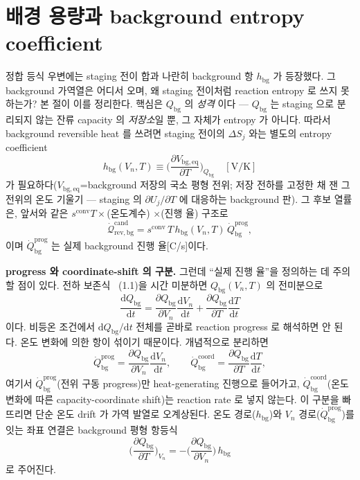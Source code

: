 \documentclass[11pt,a4paper]{article}
\newcommand{\dd}{\mathrm{d}}
\newcommand{\eq}{\mathrm{eq}}
\newcommand{\bg}{\mathrm{bg}}
\newcommand{\rev}{\mathrm{rev}}
\newcommand{\conv}{\mathrm{conv}}
\newcommand{\prog}{\mathrm{prog}}
\newcommand{\coord}{\mathrm{coord}}
\newcommand{\cand}{\mathrm{cand}}
\begin{document}
\section{배경 용량과 background entropy coefficient}\label{sec:ch2_bg}
정합 등식 우변에는 staging 전이 합과 나란히 background 항 $h_\bg$ 가 등장했다. 그 background 가역열은 어디서
오며, 왜 staging 전이처럼 reaction entropy 로 쓰지 못하는가? 본 절이 이를 정리한다. 핵심은 $Q_\bg$ 의 \emph{성격}
이다 — $Q_\bg$ 는 staging 으로 분리되지 않는 잔류 capacity 의 \emph{저장소}일 뿐, 그 자체가 entropy 가 아니다.
따라서 background reversible heat 를 쓰려면 staging 전이의 $\Delta S_j$ 와는 별도의 entropy coefficient
\begin{equation}
h_\bg(V_n,T)\equiv\Big(\frac{\partial V_{\bg,\eq}}{\partial T}\Big)_{Q_\bg}\quad[\mathrm{V/K}]
\label{eq:ch2_hbg}
\end{equation}
가 필요하다($V_{\bg,\eq}$=background 저장의 국소 평형 전위; 저장 전하를 고정한 채 잰 그 전위의 온도 기울기 —
staging 의 $\partial U_j/\partial T$ 에 대응하는 background 판). 그 후보 열률은, 앞서와 같은 $s^{\conv}T\times$(온도계수)
$\times$(진행 율) 구조로
\begin{equation}
\dot{\mathcal Q}_{\rev,\bg}^{\cand}=s^{\conv}\,T\,h_\bg(V_n,T)\,\dot Q_\bg^{\prog},
\label{eq:ch2_revbg}
\end{equation}
이며 $\dot Q_\bg^{\prog}$ 는 실제 background 진행 율[C/s]이다.

\textbf{progress 와 coordinate-shift 의 구분.} 그런데 ``실제 진행 율''을 정의하는 데 주의할 점이 있다. 전하 보존식
~(1.1)을 시간 미분하면 $Q_\bg(V_n,T)$ 의 전미분으로
\begin{equation}
\frac{\dd Q_\bg}{\dd t}=\frac{\partial Q_\bg}{\partial V_n}\frac{\dd V_n}{\dd t}+\frac{\partial Q_\bg}{\partial T}\frac{\dd T}{\dd t}
\label{eq:ch2_dQbgdt}
\end{equation}
이다. 비등온 조건에서 $\dd Q_\bg/\dd t$ 전체를 곧바로 reaction progress 로 해석하면 안 된다. 온도 변화에 의한
항이 섞이기 때문이다. 개념적으로 분리하면
\begin{equation}
\dot Q_\bg^{\prog}=\frac{\partial Q_\bg}{\partial V_n}\frac{\dd V_n}{\dd t},\qquad
\dot Q_\bg^{\coord}=\frac{\partial Q_\bg}{\partial T}\frac{\dd T}{\dd t},
\label{eq:ch2_bgsplit}
\end{equation}
여기서 $\dot Q_\bg^{\prog}$(전위 구동 progress)만 heat-generating 진행으로 들어가고, $\dot Q_\bg^{\coord}$(온도
변화에 따른 capacity-coordinate shift)는 reaction rate 로 넣지 않는다. 이 구분을 빠뜨리면 단순 온도 drift 가
가역 발열로 오계상된다. 온도 경로($h_\bg$)와 $V_n$ 경로($\dot Q_\bg^{\prog}$)를 잇는 좌표 연결은 background 평형
항등식
\begin{equation}
\Big(\frac{\partial Q_\bg}{\partial T}\Big)_{V_n}=-\Big(\frac{\partial Q_\bg}{\partial V_n}\Big)\,h_\bg
\label{eq:ch2_bgidentity}
\end{equation}
로 주어진다.
\end{document}
